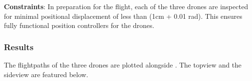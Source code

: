 \textbf{Constraints}: In preparation for the flight, each of the three drones are inspected for minimal positional displacement of less than (1cm + 0.01 rad). This ensures fully functional position controllers for the drones. 






\pagebreak

\subsubsection{Results}


The flightpaths of the three drones are plotted alongside . The topview and the sideview are featured below.


